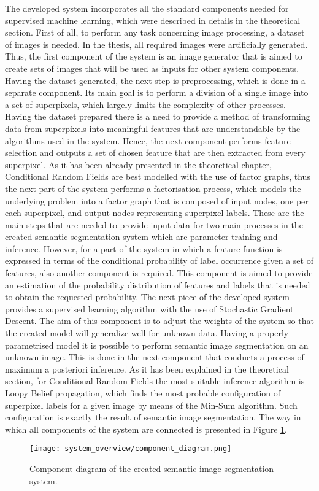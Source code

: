 The developed system incorporates all the standard components needed for supervised machine learning, which were described in details in the theoretical section. First of all, to perform any task concerning image processing, a dataset of images is needed. In the thesis, all required images were artificially generated. Thus, the first component of the system is an image generator that is aimed to create sets of images that will be used as inputs for other system components. Having the dataset generated, the next step is preprocessing, which is done in a separate component. Its main goal is to perform a division of a single image into a set of superpixels, which largely limits the complexity of other processes. Having the dataset prepared there is a need to provide a method of transforming data from superpixels into meaningful features that are understandable by the algorithms used in the system. Hence, the next component performs feature selection and outputs a set of chosen feature that are then extracted from every superpixel. As it has been already presented in the theoretical chapter, Conditional Random Fields are best modelled with the use of factor graphs, thus the next part of the system performs a factorisation process, which models the underlying problem into a factor graph that is composed of input nodes, one per each superpixel, and output nodes representing superpixel labels. These are the main steps that are needed to provide input data for two main processes in the created semantic segmentation system which are parameter training and inference. However, for a part of the system in which a feature function is expressed in terms of the conditional probability of label occurrence given a set of features, also another component is required. This component is aimed to provide an estimation of the probability distribution of features and labels that is needed to obtain the requested probability. The next piece of the developed system provides a supervised learning algorithm with the use of Stochastic Gradient Descent. The aim of this component is to adjust the weights of the system so that the created model will generalize well for unknown data. Having a properly parametrised model it is possible to perform semantic image segmentation on an unknown image. This is done in the next component that conducts a process of maximum a posteriori inference. As it has been explained in the theoretical section, for Conditional Random Fields the most suitable inference algorithm is Loopy Belief propagation, which finds the most probable configuration of superpixel labels for a given image by means of the Min-Sum algorithm. Such configuration is exactly the result of semantic image segmentation. The way in which all components of the system are connected is presented in Figure \ref{fig:component_diagram}.
\begin{figure}
    \centering
    \texttt{[image: system\_overview/component\_diagram.png]}
    \caption{Component diagram of the created semantic image segmentation system.}
    \label{fig:component_diagram}
\end{figure}


